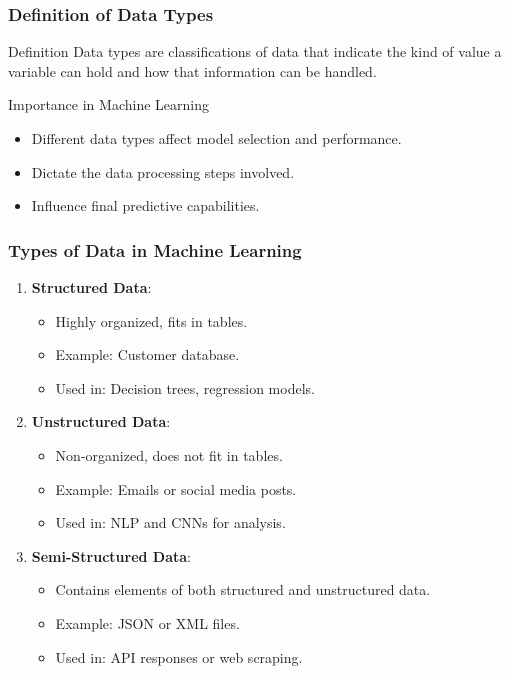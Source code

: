 \documentclass[aspectratio=169]{beamer}
\begin{document}
\begin{frame}[fragile]
    \frametitle{Definition of Data Types}
    \begin{block}{Definition}
        Data types are classifications of data that indicate the kind of value a variable can hold and how that information can be handled.
    \end{block}
    \begin{block}{Importance in Machine Learning}
        \begin{itemize}
            \item Different data types affect model selection and performance.
            \item Dictate the data processing steps involved.
            \item Influence final predictive capabilities.
        \end{itemize}
    \end{block}
\end{frame}

\begin{frame}[fragile]
    \frametitle{Types of Data in Machine Learning}
    \begin{enumerate}
        \item \textbf{Structured Data}:
            \begin{itemize}
                \item Highly organized, fits in tables.
                \item Example: Customer database.
                \item Used in: Decision trees, regression models.
            \end{itemize}
        
        \item \textbf{Unstructured Data}:
            \begin{itemize}
                \item Non-organized, does not fit in tables.
                \item Example: Emails or social media posts.
                \item Used in: NLP and CNNs for analysis.
            \end{itemize}

        \item \textbf{Semi-Structured Data}:
            \begin{itemize}
                \item Contains elements of both structured and unstructured data.
                \item Example: JSON or XML files.
                \item Used in: API responses or web scraping.
            \end{itemize}
    \end{enumerate}
\end{frame}
\end{document}
